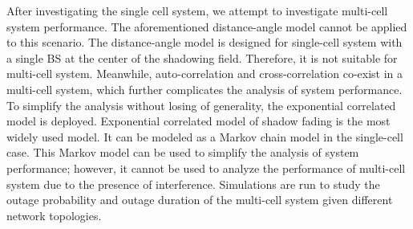 \par After investigating the single cell system, we attempt to investigate multi-cell system performance. The aforementioned distance-angle model cannot be applied to this scenario. The distance-angle model is designed for single-cell system with a single BS at the center of the shadowing field. Therefore, it is not suitable for multi-cell system. Meanwhile, auto-correlation and cross-correlation co-exist in a multi-cell system, which further complicates the analysis of system performance. To simplify the analysis without losing of generality, the exponential correlated model is deployed. Exponential correlated model of shadow fading is the most widely used model. It can be modeled as a Markov chain model in the single-cell case. This Markov model can be used to simplify the analysis of system performance; however, it cannot be used to analyze the performance of multi-cell system due to the presence of interference. Simulations are run to study the outage probability and outage duration of the multi-cell system given different network topologies. 



